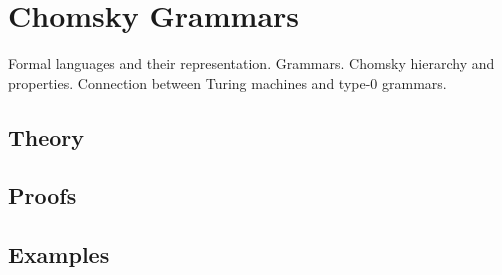 
\section{Chomsky Grammars}
\label{sec:2.3a.06-grammars-chomsky}

\begin{ticket}
Formal languages and their representation. Grammars. Chomsky hierarchy and properties. Connection between Turing machines and type-0 grammars.
\end{ticket}

\subsection*{Theory}

\subsection*{Proofs}

\subsection*{Examples}
